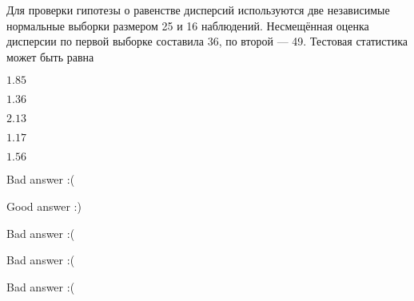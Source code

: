 
\begin{question}
Для проверки гипотезы о равенстве дисперсий используются две независимые
нормальные выборки размером 25 и 16 наблюдений. Несмещённая оценка
дисперсии по первой выборке составила 36, по второй --- 49. Тестовая
статистика может быть равна
\begin{answerlist}
  \item \(1.85\)
  \item \(1.36\)
  \item \(2.13\)
  \item \(1.17\)
  \item \(1.56\)
\end{answerlist}
\end{question}

\begin{solution}
\begin{answerlist}
  \item Bad answer :(
  \item Good answer :)
  \item Bad answer :(
  \item Bad answer :(
  \item Bad answer :(
\end{answerlist}
\end{solution}

